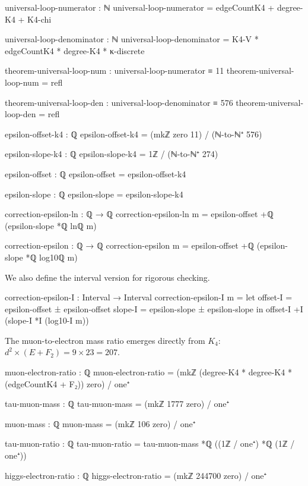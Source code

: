 \documentclass[11pt,a4paper]{book}
\begin{document}
\begin{code}
universal-loop-numerator : ℕ
universal-loop-numerator = edgeCountK4 + degree-K4 + K4-chi

universal-loop-denominator : ℕ
universal-loop-denominator = K4-V * edgeCountK4 * degree-K4 * κ-discrete

theorem-universal-loop-num : universal-loop-numerator ≡ 11
theorem-universal-loop-num = refl

theorem-universal-loop-den : universal-loop-denominator ≡ 576
theorem-universal-loop-den = refl

epsilon-offset-k4 : ℚ
epsilon-offset-k4 = (mkℤ zero 11) / (ℕ-to-ℕ⁺ 576)

epsilon-slope-k4 : ℚ
epsilon-slope-k4 = 1ℤ / (ℕ-to-ℕ⁺ 274)

epsilon-offset : ℚ
epsilon-offset = epsilon-offset-k4

epsilon-slope : ℚ  
epsilon-slope = epsilon-slope-k4

correction-epsilon-ln : ℚ → ℚ
correction-epsilon-ln m = epsilon-offset +ℚ (epsilon-slope *ℚ lnℚ m)

correction-epsilon : ℚ → ℚ
correction-epsilon m = epsilon-offset +ℚ (epsilon-slope *ℚ log10ℚ m)
\end{code}

We also define the interval version for rigorous checking.

\begin{code}
correction-epsilon-I : Interval → Interval
correction-epsilon-I m = 
  let offset-I = epsilon-offset ± epsilon-offset
      slope-I  = epsilon-slope ± epsilon-slope
  in offset-I +I (slope-I *I (log10-I m))
\end{code}

The muon-to-electron mass ratio emerges directly from $K_4$: $d^2 \times (E + F_2) = 9 \times 23 = 207$.

\begin{code}
muon-electron-ratio : ℚ
muon-electron-ratio = (mkℤ (degree-K4 * degree-K4 * (edgeCountK4 + F₂)) zero) / one⁺

tau-muon-mass : ℚ
tau-muon-mass = (mkℤ 1777 zero) / one⁺

muon-mass : ℚ
muon-mass = (mkℤ 106 zero) / one⁺

tau-muon-ratio : ℚ
tau-muon-ratio = tau-muon-mass *ℚ ((1ℤ / one⁺) *ℚ (1ℤ / one⁺))

higgs-electron-ratio : ℚ
higgs-electron-ratio = (mkℤ 244700 zero) / one⁺
\end{code}
\end{document}
